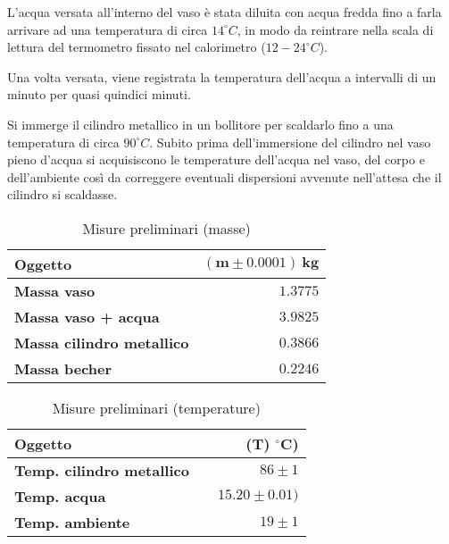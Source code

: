 \documentclass{article}
\begin{document}
	L'acqua versata all'interno del vaso è stata diluita con acqua fredda fino a farla arrivare ad una temperatura di circa \(14 ^\circ C\), in modo da reintrare nella scala di lettura del termometro fissato nel calorimetro (\(12-24 ^\circ C\)).
	
	Una volta versata, viene registrata la temperatura dell'acqua a intervalli di un minuto per quasi quindici minuti.
	
	Si immerge il cilindro metallico in un bollitore per scaldarlo fino a una temperatura di circa \(90 ^\circ C\). Subito prima dell'immersione del cilindro nel vaso pieno d'acqua si acquisiscono le temperature dell'acqua nel vaso, del corpo e dell'ambiente così da correggere eventuali dispersioni avvenute nell'attesa che il cilindro si scaldasse.
	
	\vspace{1cm}
	\begin{minipage}{0.4\textwidth}
		\begin{table}[H] \centering
			\begin{small}
				\begin{tabular}{@{}lr@{}}\toprule
					\textbf{Oggetto}&   \(\boldsymbol{(m \pm 0.0001) \SI{}{\kilogram}}\) \\ \midrule
					\textbf{Massa vaso}		 & \(1.3775\)   \\  \hdashline
					\textbf{Massa vaso + acqua}		 & \(3.9825\)   \\  \hdashline
					\textbf{Massa cilindro metallico}		 & \(0.3866\)   \\  \hdashline
					\textbf{Massa becher}		 & \(0.2246\)   \\
					\bottomrule
				\end{tabular}
			\end{small}
			\caption{Misure preliminari (masse)}
		\end{table}
	\end{minipage}
	\begin{minipage}{0.6\textwidth}
		\begin{table}[H] \centering
			\begin{small}
				\begin{tabular}{@{}lrr@{}}\toprule
					\textbf{Oggetto}					&  			& \textbf{(\(\boldsymbol{T}\))} \(\boldsymbol{^\circ C}\))\\ \midrule
					\textbf{Temp. cilindro metallico}	& 			& \(86 \pm 1\)	 \\  \hdashline
					\textbf{Temp. acqua}				&					&\(15.20 \pm 0.01)\)		 	 \\  \hdashline
					\textbf{Temp. ambiente}				&					& \(19 \pm 1\)		 	  \\  
					\bottomrule
				\end{tabular}
			\end{small}
			\caption{Misure preliminari (temperature)}
		\end{table}
	\end{minipage}
	\vspace{1cm}
	
\end{document}
